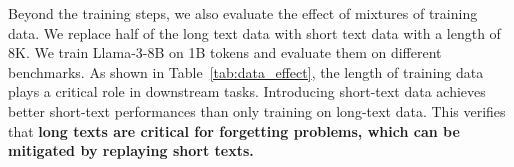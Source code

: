  Beyond the training steps, we also evaluate the effect of mixtures of training data. 
We replace half of the long text data with short text data with a length of 8K. We train Llama-3-8B on 1B tokens and evaluate them on different benchmarks. As shown in Table~\ref{tab:data_effect}, the length of training data plays a critical role in downstream tasks. 
Introducing short-text data achieves better short-text performances than only training on long-text data. This verifies that \textbf{long texts are critical for forgetting problems, which can be mitigated by replaying short texts.}



\begin{table}[htb]
    \centering
    \caption{Results of models trained with data mixtures with different lengths.}
    \label{tab:data_effect}

\end{table}

%